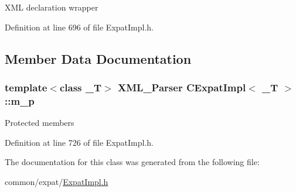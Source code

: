 \-X\-M\-L declaration wrapper 



\-Definition at line 696 of file \-Expat\-Impl.\-h.



\subsection{\-Member \-Data \-Documentation}
\hypertarget{class_c_expat_impl_a75803f8a4d4dc098f243dabbfba5de77}{
\subsubsection[{m\-\_\-p}]{\setlength{\rightskip}{0pt plus 5cm}template$<$class \-\_\-\-T$>$ \-X\-M\-L\-\_\-\-Parser {\bf \-C\-Expat\-Impl}$<$ \-\_\-\-T $>$\-::{\bf m\-\_\-p}}}\label{class_c_expat_impl_a75803f8a4d4dc098f243dabbfba5de77}


\-Protected members 



\-Definition at line 726 of file \-Expat\-Impl.\-h.



\-The documentation for this class was generated from the following file\-:\begin{DoxyCompactItemize}
\item 
common/expat/\hyperlink{_expat_impl_8h}{\-Expat\-Impl.\-h}\end{DoxyCompactItemize}
